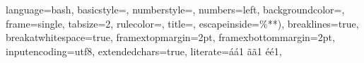 \documentclass[
	11pt, %
	french, %
	singlespacing, %
	headsepline, %
	]{MastersDoctoralThesis} %
\author{
		Alain \textsc{Ait-Ali} \\
		Martin \textsc{Laporte} \\
		Clément \textsc{Ailloud} \\
		Romain \textsc{Petit}} %
\begin{document}
	\frontmatter %

	\pagestyle{plain} %



	\lstset
	{
    	language=bash, %
    	basicstyle=\ttfamily\small,
    	numberstyle=\footnotesize,
    	numbers=left,
    	backgroundcolor=\color{gray!10},
    	frame=single,
    	tabsize=2,
    	rulecolor=\color{black!30},
    	title=\lstname,
	    escapeinside={\%*}{*)},
	    breaklines=true,
	    breakatwhitespace=true,
	    framextopmargin=2pt,
	    framexbottommargin=2pt,
	    inputencoding=utf8,
	    extendedchars=true,
	    literate={á}{{\'a}}1 {ã}{{\~a}}1 {é}{{\'e}}1,
	}

\end{document}
